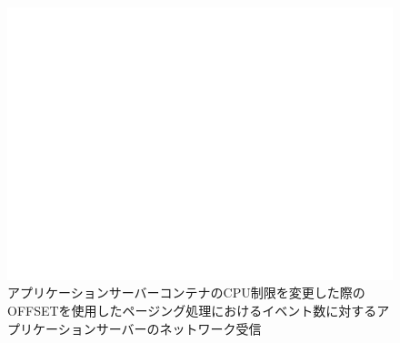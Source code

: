 \documentclass[../../../../../main]{subfiles}
\begin{document}
    \begin{figure}[H]
        \centering
        \includegraphics[width=12cm]{graph}
        \caption{アプリケーションサーバーコンテナのCPU制限を変更した際のOFFSETを使用したページング処理におけるイベント数に対するアプリケーションサーバーのネットワーク受信}
        \label{fig:paging-offset-change-app-cpu-limit-app-net-in-app_1024-db_1_1024}
    \end{figure}
\end{document}
